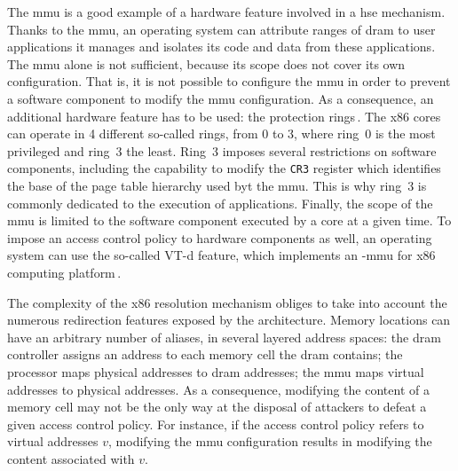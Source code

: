 The \ac{mmu} is a good example of a hardware feature involved in a \ac{hse}
mechanism.
%
Thanks to the \ac{mmu}, an operating system can attribute ranges of \ac{dram} to
user applications it manages and isolates its code and data from these
applications.
%
The \ac{mmu} alone is not sufficient, because its scope does not cover its own
configuration.
%
That is, it is not possible to configure the \ac{mmu} in order to prevent a
software component to modify the \ac{mmu} configuration.
%
As a consequence, an additional hardware feature has to be used: the protection
rings\,\cite[Volume 3, Section 5.5]{intel2014manual}.
%
The x86 cores can operate in 4 different so-called rings, from 0 to 3, where
ring~0 is the most privileged and ring~3 the least.
%
Ring~3 imposes several restrictions on software components, including the
capability to modify the \texttt{CR3} register which identifies the base of the
page table hierarchy used byt the \ac{mmu}.
%
This is why ring~3 is commonly dedicated to the execution of applications.
%
Finally, the scope of the \ac{mmu} is limited to the software component executed
by a core at a given time.
%
To impose an access control policy to hardware components as well, an operating
system can use the so-called VT-d feature, which implements an \IO-\ac{mmu} for
x86 computing platform\,\cite{abramson2006vtd}.

%
%

The complexity of the x86 \IO resolution mechanism obliges to take into account
the numerous redirection features exposed by the architecture.
%
Memory locations can have an arbitrary number of aliases, in several layered
address spaces: the \ac{dram} controller assigns an address to each memory cell
the \ac{dram} contains; the processor maps physical addresses to \ac{dram}
addresses; the \ac{mmu} maps virtual addresses to physical addresses.
%
As a consequence, modifying the content of a memory cell may not be the only way
at the disposal of attackers to defeat a given access control policy.
%
For instance, if the access control policy refers to virtual addresses \( v \),
modifying the \ac{mmu} configuration results in modifying the content associated
with \( v \).

